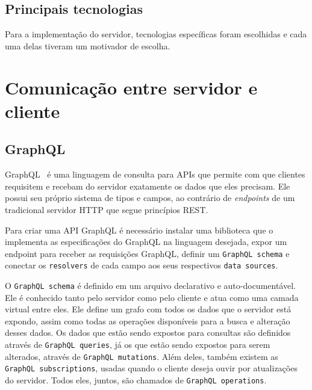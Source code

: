 \FloatBarrier

\subsection{Principais tecnologias} %

Para a implementação do servidor, tecnologias específicas foram escolhidas e cada uma delas tiveram um motivador de escolha.





\section{Comunicação entre servidor e cliente}

\subsection{GraphQL}

GraphQL~\cite{graphql} é uma linguagem de consulta para APIs que permite com que clientes requisitem e recebam do servidor exatamente os dados que eles precisam. Ele possui seu próprio sistema de tipos e campos, ao contrário de \emph{endpoints} de um tradicional servidor HTTP que segue princípios REST.

Para criar uma API GraphQL é necessário instalar uma biblioteca que o implementa as especificações do GraphQL  na linguagem desejada, expor um endpoint para receber as requisições GraphQL, definir um \texttt{GraphQL schema} e conectar os \texttt{resolvers} de cada campo aos seus respectivos \texttt{data sources}.

O \texttt{GraphQL schema} é definido em um arquivo declarativo e auto-documentável. Ele é conhecido tanto pelo servidor como pelo cliente e atua como uma camada virtual entre eles. Ele define um grafo com todos os dados que o servidor está expondo, assim como todas as operações disponíveis para a busca e alteração desses dados. Os dados que estão sendo expostos para consultas são definidos através de \texttt{GraphQL queries}, já os que estão sendo expostos para serem alterados, através de \texttt{GraphQL mutations}. Além deles, também existem as \texttt{GraphQL subscriptions}, usadas quando o cliente deseja ouvir por atualizações do servidor. Todos eles, juntos, são chamados de \texttt{GraphQL operations}.

